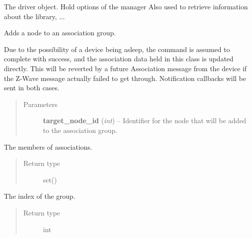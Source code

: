 \documentclass[letterpaper,10pt,english]{sphinxmanual}
\begin{document}
\begin{fulllineitems}
\label{group:openzwave.group.ZWaveGroup}
The driver object.
Hold options of the manager
Also used to retrieve information about the library, ...

\begin{fulllineitems}
\label{group:openzwave.group.ZWaveGroup.add_association}
Adds a node to an association group.

Due to the possibility of a device being asleep, the command is assumed to
complete with success, and the association data held in this class is updated directly.  This
will be reverted by a future Association message from the device if the Z-Wave
message actually failed to get through.  Notification callbacks will be sent in
both cases.
\begin{quote}\begin{description}
\item[{Parameters}] \leavevmode
\textbf{target\_node\_id} (\emph{int}) -- Identifier for the node that will be added to the association group.

\end{description}\end{quote}

\end{fulllineitems}


\begin{fulllineitems}
\label{group:openzwave.group.ZWaveGroup.associations}
The members of associations.
\begin{quote}\begin{description}
\item[{Return type}] \leavevmode
set()

\end{description}\end{quote}

\end{fulllineitems}


\begin{fulllineitems}
\label{group:openzwave.group.ZWaveGroup.index}
The index of the group.
\begin{quote}\begin{description}
\item[{Return type}] \leavevmode
int


\end{description}
\end{quote}
\end{fulllineitems}
\end{fulllineitems}
\end{document}
